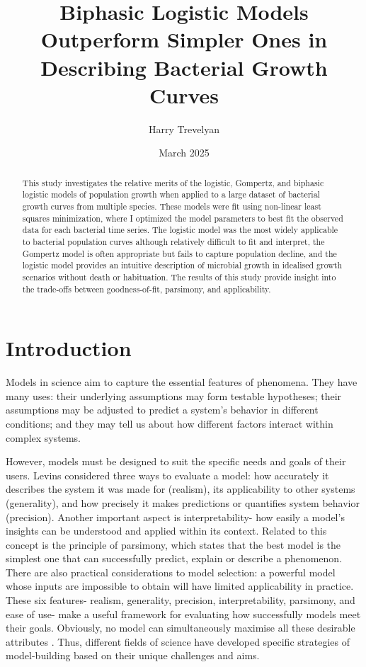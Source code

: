 \documentclass{article}
\title{Biphasic Logistic Models Outperform Simpler Ones in Describing Bacterial Growth Curves}
\begin{document}
\author{Harry Trevelyan}
\date{March 2025}

\maketitle

\begin{abstract}
This study investigates the relative merits of the logistic, Gompertz, and biphasic logistic models of population growth when applied to a large dataset of bacterial growth curves from multiple species. These models were fit using non-linear least squares minimization, where I optimized the model parameters to best fit the observed data for each bacterial time series. The logistic model was the most widely applicable to bacterial population curves although relatively difficult to fit and interpret, the Gompertz model is often appropriate but fails to capture population decline, and the logistic model provides an intuitive description of microbial growth in idealised growth scenarios without death or habituation. The results of this study provide insight into the trade-offs between goodness-of-fit, parsimony, and applicability.
\end{abstract}

\section{Introduction}
Models in science aim to capture the essential features of phenomena. They have many uses: their underlying assumptions may form testable hypotheses; their assumptions may be adjusted to predict a system's behavior in different conditions; and they may tell us about how different factors interact within complex systems. 

However, models must be designed to suit the specific needs and goals of their users. Levins \cite{levins1966} considered three ways to evaluate a model: how accurately it describes the system it was made for (realism), its applicability to other systems (generality), and how precisely it makes predictions or quantifies system behavior (precision). Another important aspect is interpretability- how easily a model’s insights can be understood and applied within its context. Related to this concept is the principle of parsimony, which states that the best model is the simplest one that can successfully predict, explain or describe a phenomenon. There are also practical considerations to model selection: a powerful model whose inputs are impossible to obtain will have limited applicability in practice. These six features- realism, generality, precision, interpretability, parsimony, and ease of use- make a useful framework for evaluating how successfully models meet their goals. Obviously, no model can simultaneously maximise all these desirable attributes \cite{levins1966}. Thus, different fields of science have developed specific strategies of model-building based on their unique challenges and aims.
\end{document}
